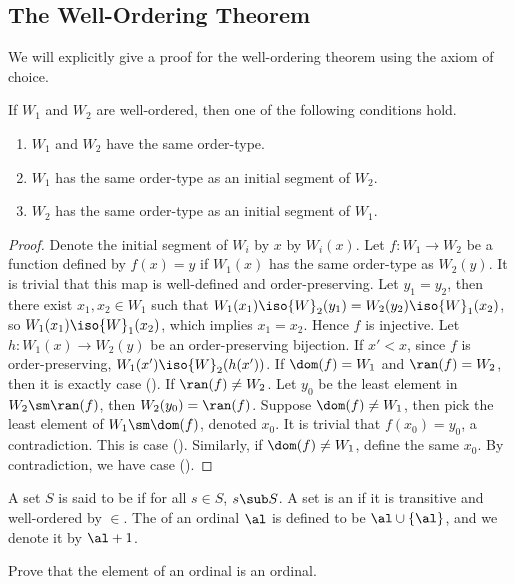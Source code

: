 \documentclass[10pt]{article}
\begin{document}
\subsection{The Well-Ordering Theorem}
We will explicitly give a proof for the well-ordering theorem using the axiom of choice.
\begin{proposition}
    If ${W}_{1}$ and ${W}_{2}$ are well-ordered, then one of the following conditions hold.
    \begin{enumerate}
        \item ${W}_{1}$ and ${W}_{2}$ have the same order-type.
        \item ${W}_{1}$ has the same order-type as an initial segment of ${W}_{2}$.
        \item ${W}_{2}$ has the same order-type as an initial segment of ${W}_{1}$.
    \end{enumerate}
\end{proposition}
\begin{proof}
    Denote the initial segment of ${W}_{i}$ by $x$ by ${W}_{i}(x)$. Let $f:{W}_{1}\to{W}_{2}$ be a function defined by $f(x)=y$ if ${W}_{1}(x)$ has the same order-type as ${W}_{2}(y)$. It is trivial that this map is well-defined and order-preserving. Let ${y}_{1}={y}_{2}$, then there exist ${x}_{1},{x}_{2}\in{W}_{1}$ such that ${W}_{1}({x}_{1})\iso{W}_{2}({y}_{1})={W}_{2}({y}_{2})\iso{W}_{1}({x}_{2})$, so ${W}_{1}({x}_{1})\iso{W}_{1}({x}_{2})$, which implies ${x}_{1}={x}_{2}$. Hence $f$ is injective. Let $h:{W}_{1}(x)\to{W}_{2}(y)$ be an order-preserving bijection. If $x'<x$, since $f$ is order-preserving, ${W}_{1}(x')\iso{W}_{2}(h(x'))$. If $\dom(f)={W}_{1}$ and $\ran(f)={W}_{2}$, then it is exactly case (). If $\ran(f)\ne{W}_{2}$. Let ${y}_{0}$ be the least element in ${W}_{2}\sm\ran(f)$, then ${W}_{2}({y}_{0})=\ran(f)$. Suppose $\dom(f)\ne{W}_{1}$, then pick the least element of ${W}_{1}\sm\dom(f)$, denoted ${x}_{0}$. It is trivial that $f({x}_{0})={y}_{0}$, a contradiction. This is case (). Similarly, if $\dom(f)\ne{W}_{1}$, define the same ${x}_{0}$. By contradiction, we have case ().
\end{proof}
\begin{definition}
    A set $S$ is said to be  if for all $s\in S$, $s\sub S$. A set is an  if it is transitive and well-ordered by $\in$. The  of an ordinal $\al$ is defined to be $\al\cup\{\al\}$, and we denote it by $\al+1$. 
\end{definition}
\begin{problem}
    Prove that the element of an ordinal is an ordinal.
\end{problem}
\end{document}
